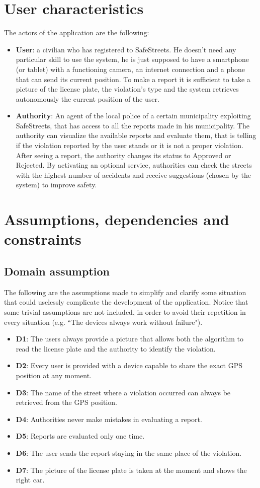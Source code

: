 \documentclass[12pt,a4paper]{report}
\begin{document}
	\section{User characteristics}
		The actors of the application are the following:
		\begin{itemize}
			\item \textbf{User}:
				a civilian who has registered to SafeStreets. He doesn't need any particular skill to use the system, 
				he is just supposed to have a smartphone (or tablet) with a functioning camera, an internet connection and
				a phone that can send its current position.  To make a report it is sufficient to
				take a picture of the license plate, the violation's type and the system retrieves autonomously the current position
				of the user.
			\item \textbf{Authority}:
				An agent of the local police of a certain municipality exploiting SafeStreets, that has access to all the reports made
				 in his municipality. The authority can visualize the available reports and evaluate them, that is telling if the
				violation reported by the user stands or it is not a proper violation. After seeing a report, the authority 
				changes its status to Approved or Rejected. By activating
				an optional service, authorities can check the streets with the highest number of accidents and receive
				suggestions (chosen by the system) to improve safety.
		\end{itemize}
	\section{Assumptions, dependencies and constraints}
	\subsection{Domain assumption} 
The following are the assumptions made to simplify and clarify some situation that could uselessly complicate the development of the application. Notice that some trivial assumptions are not included, in order to avoid their repetition in every situation (e.g. ``The devices always work without failure").
		\begin{itemize}
			\item \textbf{D1}: The users always provide a picture that allows both the algorithm to read the license plate and
					        the authority to identify the violation.
			\item \textbf{D2}: Every user is provided with a device capable to share the exact GPS position at any moment.
			\item \textbf{D3}: The name of the street where a violation occurred can always be retrieved from the GPS position.
			\item \textbf{D4}: Authorities never make mistakes in evaluating a report.
			\item \textbf{D5}: Reports are evaluated only one time.
			\item \textbf{D6}: The user sends the report staying in the same place of the violation.
			\item \textbf{D7}: The picture of the license plate is taken at the moment and shows the right car.
		\end{itemize}
\end{document}

